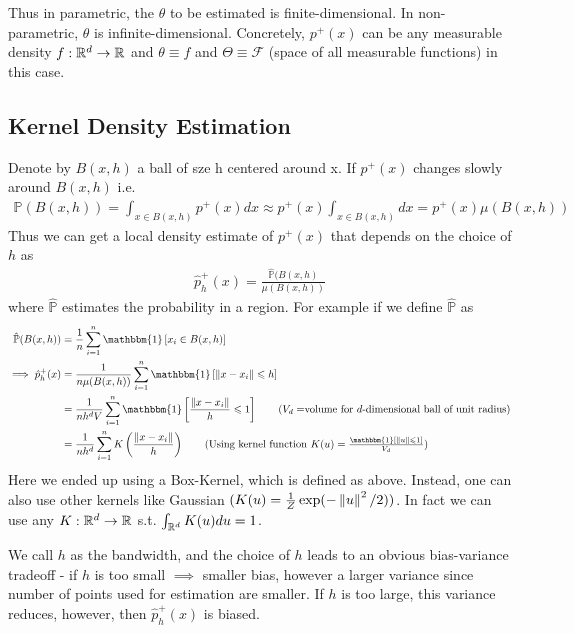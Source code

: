 \documentclass[11pt]{report}
\begin{document}
Thus in parametric, the $\theta$ to be estimated is finite-dimensional. In non-parametric, $\theta$ is infinite-dimensional. Concretely, $p^+(x)$ can be any measurable density $f: \mathbb{R}^d \rightarrow \mathbb{R}$ and $\theta \equiv f$ and $\Theta \equiv \mathcal{F}$ (space of all measurable functions) in this case. 

\subsection{Kernel Density Estimation}
Denote by $B(x, h)$ a ball of sze h centered around x. If $p^+(x)$ changes slowly around $B(x,h)$ i.e. 
\begin{align}
    \mathbb{P}(B(x,h)) = \int _{x \in B(x,h)} p^+(x)dx \approx p^+(x) \int _{x \in B(x,h)} dx = p^+(x) \mu(B(x,h))
\end{align}
Thus we can get a local density estimate of $p^+(x)$ that depends on the choice of $h$ as
\begin{align}
    \hat{p}_h^+(x) = \frac{\hat{\mathbb{P}}(B(x,h)}{\mu(B(x,h))}
\end{align}
where $\hat{\mathbb{P}}$ estimates the probability in a region. For example if we define $\hat{\mathbb{P}}$ as
\begin{align}
    \hat{\mathbb{P}}(B(x,h)) &= \frac{1}{n} \sum _{i=1} ^n \mathbbm{1}\left[ x_i \in B(x,h)\right]\\
    \implies \hat{p}_h^+(x) &= \frac{1}{n \mu(B(x,h))}\sum _{i=1} ^n \mathbbm{1}\left[ \norm{x - x_i} \leq h\right] \nonumber\\
    &= \frac{1}{nh^dV}\sum _{i=1} ^n \mathbbm{1}\left[ \frac{\norm{x - x_i}}{h} \leq 1\right] \tag*{\text{($V_d=$volume for $d$-dimensional ball of unit radius)}} \nonumber\\
    &= \frac{1}{nh^d}\sum _{i=1} ^n K\left(\frac{\norm{x - x_i}}{h}\right) \tag*{\text{(Using kernel function $K(u) = \frac{\mathbbm{1}[\norm{u} \leq 1]}{V_d}$)}} \nonumber\\
\end{align}
Here we ended up using a Box-Kernel, which is defined as above. Instead, one can also use other kernels like Gaussian $(K(u) = \frac{1}{Z} \exp(-\left\lVert u \right\rVert^2/2))$. In fact we can use any $K: \mathbb{R}^d \rightarrow \mathbb{R}$ s.t. $\int _{\mathbb{R}^d} K(u)du = 1$. 

We call $h$ as the bandwidth, and the choice of $h$ leads to an obvious bias-variance tradeoff - if $h$ is too small $\implies$ smaller bias, however a larger variance since number of points used for estimation are smaller. If $h$ is too large, this variance reduces, however, then $\hat{p}_h^+(x)$ is biased. 
\end{document}
